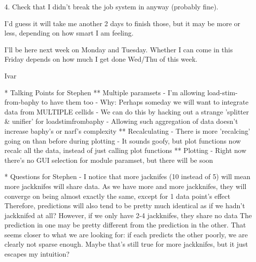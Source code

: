 {{4. Check that I didn't break the job system in anyway (probably fine).

I'd guess it will take me another 2 days to finish those, but it may be more or less, depending on how smart I am feeling. 

I'll be here next week on Monday and Tuesday. Whether I can come in this Friday depends on how much I get done Wed/Thu of this week. 


Ivar


* Talking Points for Stephen
** Multiple paramsets
  - I'm allowing load-stim-from-baphy to have them too
    - Why: Perhaps someday we will want to integrate data from MULTIPLE cellids
    - We can do this by hacking out a strange 'splitter & unifier' for loadstimfrombaphy
    - Allowing such aggregation of data doesn't increase baphy's or narf's complexity
** Recalculating
  - There is more 'recalcing' going on than before during plotting
  - It sounds goofy, but plot functions now recalc all the data, instead of just calling plot functions 
** Plotting
   - Right now there's no GUI selection for module paramset, but there will be soon

* Questions for Stephen
  - I notice that more jacknifes (10 instead of 5) will mean more jackknifes will share data.
    As we have more and more jackknifes, they will converge on being almost exactly the same, except for 1 data point's effect
    Therefore, predictions will also tend to be pretty much identical as if we hadn't jackknifed at all?
    However, if we only have 2-4 jackknifes, they share no data
    The prediction in one may be pretty different from the prediction in the other. 
    That seems closer to what we are looking for: if each predicts the other poorly, we are clearly not sparse enough.
    Maybe that's still true for more jackknifes, but it just escapes my intuition?

}}
